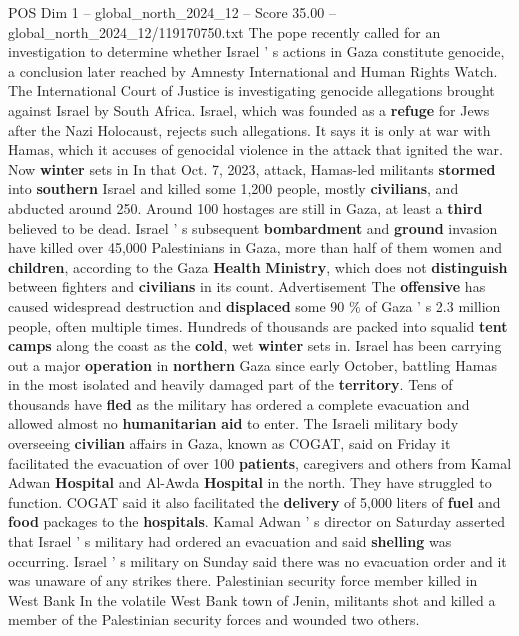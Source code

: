 \begin{textsample}{POS Dim 1 – global\_north\_2024\_12 – Score 35.00 – global\_north\_2024\_12/119170750.txt}
The pope recently called for an investigation to determine whether Israel ' s actions in Gaza constitute genocide, a conclusion later reached by Amnesty International and Human Rights Watch.
The International Court of Justice is investigating genocide allegations brought against Israel by South Africa.
Israel, which was founded as a \textbf{refuge} for Jews after the Nazi Holocaust, rejects such allegations.
It says it is only at war with Hamas, which it accuses of genocidal violence in the attack that ignited the war.
Now \textbf{winter} sets in In that Oct. 7, 2023, attack, Hamas-led militants \textbf{stormed} into \textbf{southern} Israel and killed some 1,200 people, mostly \textbf{civilians}, and abducted around 250.
Around 100 hostages are still in Gaza, at least a \textbf{third} believed to be dead.
Israel ' s subsequent \textbf{bombardment} and \textbf{ground} invasion have killed over 45,000 Palestinians in Gaza, more than half of them women and \textbf{children}, according to the Gaza \textbf{Health} \textbf{Ministry}, which does not \textbf{distinguish} between fighters and \textbf{civilians} in its count.
Advertisement The \textbf{offensive} has caused widespread destruction and \textbf{displaced} some 90 \% of Gaza ' s 2.3 million people, often multiple times.
Hundreds of thousands are packed into squalid \textbf{tent} \textbf{camps} along the coast as the \textbf{cold}, wet \textbf{winter} sets in.
Israel has been carrying out a major \textbf{operation} in \textbf{northern} Gaza since early October, battling Hamas in the most isolated and heavily damaged part of the \textbf{territory}.
Tens of thousands have \textbf{fled} as the military has ordered a complete evacuation and allowed almost no \textbf{humanitarian} \textbf{aid} to enter.
The Israeli military body overseeing \textbf{civilian} affairs in Gaza, known as COGAT, said on Friday it facilitated the evacuation of over 100 \textbf{patients}, caregivers and others from Kamal Adwan \textbf{Hospital} and Al-Awda \textbf{Hospital} in the north.
They have struggled to function.
COGAT said it also facilitated the \textbf{delivery} of 5,000 liters of \textbf{fuel} and \textbf{food} packages to the \textbf{hospitals}.
Kamal Adwan ' s director on Saturday asserted that Israel ' s military had ordered an evacuation and said \textbf{shelling} was occurring.
Israel ' s military on Sunday said there was no evacuation order and it was unaware of any strikes there.
Palestinian security force member killed in West Bank In the volatile West Bank town of Jenin, militants shot and killed a member of the Palestinian security forces and wounded two others.

\end{textsample}
